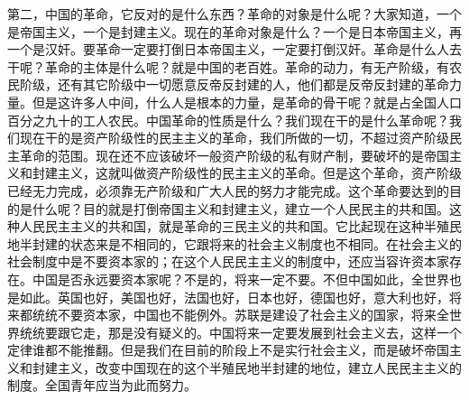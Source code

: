第二，中国的革命，它反对的是什么东西？革命的对象是什么呢？大家知道，一个是帝国主义，一个是封建主义。现在的革命对象是什么？一个是日本帝国主义，再一个是汉奸。要革命一定要打倒日本帝国主义，一定要打倒汉奸。革命是什么人去干呢？革命的主体是什么呢？就是中国的老百姓。革命的动力，有无产阶级，有农民阶级，还有其它阶级中一切愿意反帝反封建的人，他们都是反帝反封建的革命力量。但是这许多人中间，什么人是根本的力量，是革命的骨干呢？就是占全国人口百分之九十的工人农民。中国革命的性质是什么？我们现在干的是什么革命呢？我们现在干的是资产阶级性的民主主义的革命，我们所做的一切，不超过资产阶级民主革命的范围。现在还不应该破坏一般资产阶级的私有财产制，要破坏的是帝国主义和封建主义，这就叫做资产阶级性的民主主义的革命。但是这个革命，资产阶级已经无力完成，必须靠无产阶级和广大人民的努力才能完成。这个革命要达到的目的是什么呢？目的就是打倒帝国主义和封建主义，建立一个人民民主的共和国。这种人民民主主义的共和国，就是革命的三民主义的共和国。它比起现在这种半殖民地半封建的状态来是不相同的，它跟将来的社会主义制度也不相同。在社会主义的社会制度中是不要资本家的；在这个人民民主主义的制度中，还应当容许资本家存在。中国是否永远要资本家呢？不是的，将来一定不要。不但中国如此，全世界也是如此。英国也好，美国也好，法国也好，日本也好，德国也好，意大利也好，将来都统统不要资本家，中国也不能例外。苏联是建设了社会主义的国家，将来全世界统统要跟它走，那是没有疑义的。中国将来一定要发展到社会主义去，这样一个定律谁都不能推翻。但是我们在目前的阶段上不是实行社会主义，而是破坏帝国主义和封建主义，改变中国现在的这个半殖民地半封建的地位，建立人民民主主义的制度。全国青年应当为此而努力。

